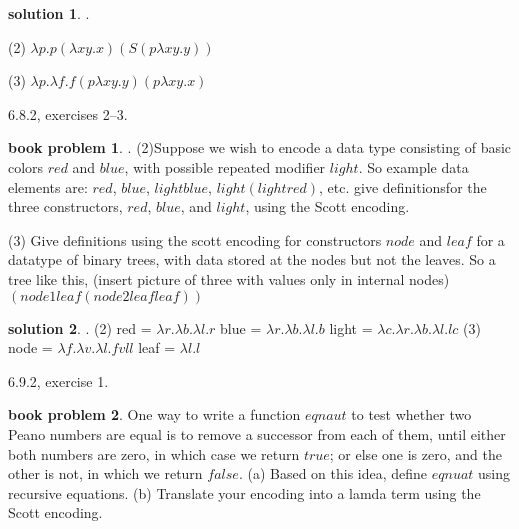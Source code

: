 \documentclass[10pt]{article}
\theoremstyle{definition}
\newtheorem{bp}{book problem}
\newtheorem{sol}{solution}
\begin{document}
\begin{sol}. \newline

	(2) $\lambda p.p( \lambda xy.x)(S(p \lambda x y.y))$

	(3) $\lambda p. \lambda f. f( p \lambda xy.y)(p \lambda xy.x)$

\end{sol}

6.8.2, exercises 2--3.

\begin{bp}. \newline
	(2)Suppose we wish to encode a data type consisting of basic colors $red$ and $blue$, with possible repeated modifier $light$. So example data elements are: $red$, $blue$, $light blue$, $light(light red)$, etc. \newline
	give definitionsfor the three constructors, $red$, $blue$, and $light$, using the Scott encoding.

	(3) Give definitions using the scott encoding for constructors $node$ and $leaf$ for a datatype of binary trees, with data stored at the nodes but not the leaves. So a tree like this, (insert picture of three with values only in internal nodes) $(node 1 leaf(node 2 leaf leaf))$
\end{bp}

\begin{sol}. \newline
	(2) \newline
	red = $\lambda r. \lambda b. \lambda l. r$ \newline
	blue = $\lambda r. \lambda b. \lambda l. b$ \newline
	light = $\lambda c. \lambda r. \lambda b. \lambda l. lc$ \newline
	(3) \newline
	node = $\lambda f. \lambda v. \lambda l. f v l l$ \newline
	leaf = $ \lambda l.l$



\end{sol}

6.9.2, exercise 1.

\begin{bp}
	One way to write a function $eqnaut$ to test whether two Peano numbers are equal is to remove a successor from each of them, until either both numbers are zero, in which case we return $true$; or else one is zero, and the other is not, in which we return $false$.
	(a) Based on this idea, define $eqnuat$ using recursive equations.
	(b) Translate your encoding into a lamda term using the Scott encoding.
\end{bp}
\end{document}
